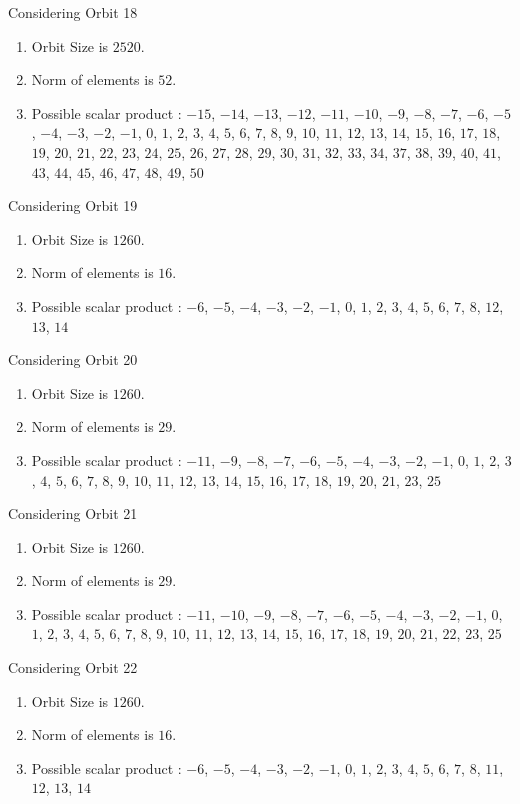 \documentclass[12pt]{article}
\begin{document}
Considering Orbit 18
\begin{enumerate}
\item Orbit Size is $2520$.
\item Norm of elements is $52$.
\item Possible scalar product : $-15$, $-14$, $-13$, $-12$, $-11$, $-10$, $-9$, $-8$, $-7$, $-6$, $-5$, $-4$, $-3$, $-2$, $-1$, $0$, $1$, $2$, $3$, $4$, $5$, $6$, $7$, $8$, $9$, $10$, $11$, $12$, $13$, $14$, $15$, $16$, $17$, $18$, $19$, $20$, $21$, $22$, $23$, $24$, $25$, $26$, $27$, $28$, $29$, $30$, $31$, $32$, $33$, $34$, $37$, $38$, $39$, $40$, $41$, $43$, $44$, $45$, $46$, $47$, $48$, $49$, $50$
\end{enumerate}
Considering Orbit 19
\begin{enumerate}
\item Orbit Size is $1260$.
\item Norm of elements is $16$.
\item Possible scalar product : $-6$, $-5$, $-4$, $-3$, $-2$, $-1$, $0$, $1$, $2$, $3$, $4$, $5$, $6$, $7$, $8$, $12$, $13$, $14$
\end{enumerate}
Considering Orbit 20
\begin{enumerate}
\item Orbit Size is $1260$.
\item Norm of elements is $29$.
\item Possible scalar product : $-11$, $-9$, $-8$, $-7$, $-6$, $-5$, $-4$, $-3$, $-2$, $-1$, $0$, $1$, $2$, $3$, $4$, $5$, $6$, $7$, $8$, $9$, $10$, $11$, $12$, $13$, $14$, $15$, $16$, $17$, $18$, $19$, $20$, $21$, $23$, $25$
\end{enumerate}
Considering Orbit 21
\begin{enumerate}
\item Orbit Size is $1260$.
\item Norm of elements is $29$.
\item Possible scalar product : $-11$, $-10$, $-9$, $-8$, $-7$, $-6$, $-5$, $-4$, $-3$, $-2$, $-1$, $0$, $1$, $2$, $3$, $4$, $5$, $6$, $7$, $8$, $9$, $10$, $11$, $12$, $13$, $14$, $15$, $16$, $17$, $18$, $19$, $20$, $21$, $22$, $23$, $25$
\end{enumerate}
Considering Orbit 22
\begin{enumerate}
\item Orbit Size is $1260$.
\item Norm of elements is $16$.
\item Possible scalar product : $-6$, $-5$, $-4$, $-3$, $-2$, $-1$, $0$, $1$, $2$, $3$, $4$, $5$, $6$, $7$, $8$, $11$, $12$, $13$, $14$
\end{enumerate}
\end{document}
